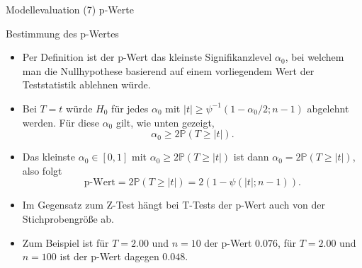 \documentclass[
  8pt,
  ignorenonframetext,
]{beamer}
\begin{document}
\begin{frame}{Modellevaluation}
\protect\hypertarget{modellevaluation-15}{}
\noindent (7) p-Werte

\small

Bestimmung des p-Wertes \vspace{2mm}

\begin{itemize}
\item
  \itemsep2mm \justifying Per Definition ist der p-Wert das kleinste
  Signifikanzlevel \(\alpha_0\), bei welchem man die Nullhypothese
  basierend auf einem vorliegendem Wert der Teststatistik ablehnen
  würde.
\item
  Bei \(T = t\) würde \(H_0\) für jedes \(\alpha_0\) mit
  \(|t| \ge \psi^{-1}(1-\alpha_0/2; n-1)\) abgelehnt werden. Für diese
  \(\alpha_0\) gilt, wie unten gezeigt, \begin{equation}
  \alpha_0 \ge 2 \mathbb{P}(T \ge |t|).
  \end{equation}
\item
  Das kleinste \(\alpha_0 \in [0,1]\) mit
  \(\alpha_0 \ge 2 \mathbb{P}(T \ge |t|)\) ist dann
  \(\alpha_0 = 2 \mathbb{P}(T \ge |t|)\), also folgt \begin{equation}
  \mbox{p-Wert} =  2 \mathbb{P}(T \ge |t|) = 2(1 - \psi(|t|;n-1)).
  \end{equation}
\item
  Im Gegensatz zum Z-Test hängt bei T-Tests der p-Wert auch von der
  Stichprobengröße ab.
\item
  Zum Beispiel ist für \(T = 2.00\) und \(n = 10\) der p-Wert \(0.076\),
  für \(T = 2.00\) und \(n = 100\) ist der p-Wert dagegen \(0.048\).
\end{itemize}
\end{frame}
\end{document}
